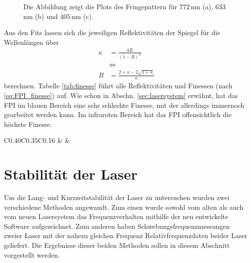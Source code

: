 \begin{figure}[hp]
 	\centering
 	\footnotesize
 	\fbox{\parbox{\dimexpr \linewidth - 2\fboxrule - 2\fboxsep}{
 	\subfigure[]{
		\label{subfig:finesse_messung_a}
		
		}
 	\subfigure[]{
		\label{subfig:finesse_messung_b}
		
		}
	 \subfigure[]{
		\label{subfig:finesse_messung_c}
		
		}
	}}
	\caption[Finesse des FPIs]{Die Abbildung zeigt die Plots des
 	Fringepattern für $772\,$nm (a), $633\,$nm (b) und $405\,$nm (c).}
	\label{fig:finesse_messung}
\end{figure}
Aus den Fits lassen sich die jeweiligen Reflektivitäten der Spiegel für die
Wellenlängen über
\begin{equation}\label{eq:finesse_messung_02}
	\begin{split}
		\kappa&=\frac{4R}{(1-R)^2}\\
		&\Leftrightarrow\\
		R&=\frac{2+\kappa-2\sqrt{1+\kappa}}{\kappa}
	\end{split}	
\end{equation}
berechnen. Tabelle \ref{tab:finesse} führt alle Reflektivitäten und Finessen
(nach \ref{eq:FPI_finesse}) auf. Wie schon in Abschn. \ref{sec:lasersystem}
erwähnt, hat das FPI im blauen Bereich eine sehr schlechte Finesse, mit der
allerdings immernoch gearbeitet werden kann. Im infraroten Bereich hat das FPI
offensichtlich die höchste Finesse.
\begin{table}[h]
	\begin{tabular}{C{0.40\textwidth}C{0.35\textwidth}C{0.16\textwidth}}
		\toprule
		 &
		 &
		\\
		\midrule[1px]
		\hline
		
		\bottomrule[1px]
	\end{tabular}
	\caption[FPI Finesse]{Aufgelistet sind die Messwerte für die Reflektivität der
	Spiegel und die Finesse des FPIs in Abhängigkeit von der Wellenlänge.}
	\label{tab:finesse}
\end{table}

\section{Stabilität der Laser}\label{sec:stabilitaet_der_laser}
Um die Lang- und Kurzzeitstabilität der Laser zu untersuchen wurden zwei
verschiedene Methoden angewandt. Zum einen wurde sowohl vom alten als auch vom
neuen Lasersystem das Frequenzverhalten mithilfe der neu entwickelte Software
aufgezeichnet. Zum anderen haben Schwebungsfrequenzmessungen zweier Laser mit
der nahezu gleichen Frequenz Relativfrequenzdaten beider Laser geliefert. Die
Ergebnisse dieser beiden Methoden sollen in diesem Abschnitt vorgestellt werden.

